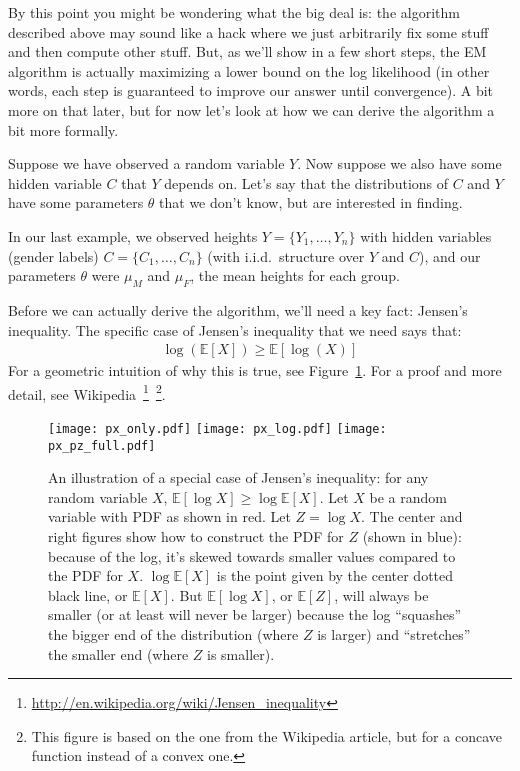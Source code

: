 \documentclass[12pt]{article}
\newcommand{\E}[1]{\mathbb{E}\left[#1\right]}
\begin{document}
    By this point you might be wondering what the big deal is: the algorithm
    described above may sound like a hack where we just arbitrarily fix some
    stuff and then compute other stuff. But, as we'll show in a few short
    steps, the EM algorithm is actually maximizing a lower bound on the log
    likelihood (in other words, each step is guaranteed to improve our answer
    until convergence). A bit more on that later, but for now let's look at how
    we can derive the algorithm a bit more formally.

    Suppose we have observed a random variable $Y$.  Now suppose we also have
    some hidden variable $C$ that $Y$ depends on.  Let's say that the
    distributions of $C$ and $Y$ have some parameters $\theta$ that we don't
    know, but are interested in finding.

    In our last example, we observed heights $Y = \{Y_1, \ldots, Y_n\}$ with
    hidden variables (gender labels) $C = \{C_1, \ldots, C_n\}$ (with i.i.d.\
    structure over $Y$ and $C$), and our parameters $\theta$ were $\mu_M$ and
    $\mu_F$, the mean heights for each group.

    Before we can actually derive the algorithm, we'll need a key fact: Jensen's
    inequality. The specific case of Jensen's inequality that we need
    says that:
    \begin{align}
        \label{eq:jensen-log}\log(\mathbb{E}[X]) \geq \mathbb{E}[\log(X)]
    \end{align}
    For a geometric intuition of why this is true, see Figure~\ref{fig:jensen}.
    For a proof and more detail, see
    Wikipedia~\footnote{\url{http://en.wikipedia.org/wiki/Jensen_inequality}}~\footnote{This
        figure is based on the one from the Wikipedia article, but for a
    concave function instead of a convex one.}.
    \begin{figure}[t]
        \centering
            \hspace*{\fill}
            \texttt{[image: px\_only.pdf]}
            \hfill
            \texttt{[image: px\_log.pdf]}
            \hfill
            \texttt{[image: px\_pz\_full.pdf]}
            \hspace*{\fill}
        \caption{An illustration of a special case of Jensen's inequality:
            for any random variable $X$, $\mathbb{E}[\log X] \geq \log \mathbb{E}[X]$. Let
            $X$ be a random variable with PDF as shown in red. Let
            $Z=\log X$. The center and right figures show how to construct
            the PDF for $Z$ (shown in blue): because of the log, it's skewed towards
            smaller values compared to the PDF for $X$. $\log\mathbb{E}[X]$ is the point given by the
            center dotted black line, or $\E{X}$. But $\E{\log X}$, or 
            $\E{Z}$, will always be smaller (or at least will never be larger) because the log ``squashes''
            the bigger end of the distribution (where $Z$ is larger) and ``stretches'' the smaller
            end (where $Z$ is smaller).}
        \label{fig:jensen}
    \end{figure}
\end{document}
